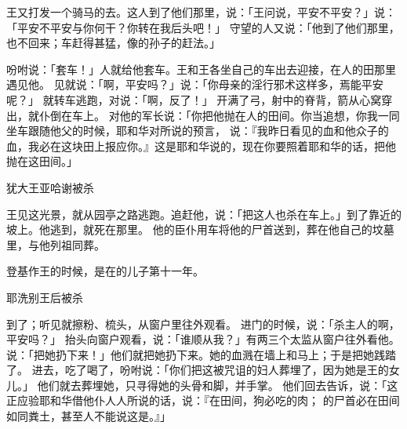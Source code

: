 {王又打发一个骑马的去。这人到了他们那里，说：「王问说，平安不平安？」{}说：「平安不平安与你何干？你转在我后头吧！」
守望的人又说：「他到了他们那里，也不回来；车赶得甚猛，像{}的孙子{}的赶法。」
\par }{\PP {}吩咐说：「套车！」人就给他套车。{}王{}和{}王{}各坐自己的车出去迎接{}，在{}人{}的田那里遇见他。
见{}就说：「{}啊，平安吗？」{}说：「你母亲{}的淫行邪术这样多，焉能平安呢？」
就转车逃跑，对{}说：「{}啊，反了！」
开满了弓，射中{}的脊背，箭从心窝穿出，{}就仆倒在车上。
对他的军长{}说：「你把他抛在{}人{}的田间。你当追想，你我一同坐车跟随他父{}的时候，耶和华对{}所说的预言，
说：『我昨日看见{}的血和他众子的血，我必在这块田上报应你。』这是耶和华说的，现在你要照着耶和华的话，把他抛在这田间。」
\par }{\SH 犹大王亚哈谢被杀
\par }{\PP {}王{}见这光景，就从园亭之路逃跑。{}追赶他，说：「把这人也杀在车上。」到了靠近{}{}的坡上{}。他逃到{}，就死在那里。
他的臣仆用车将他的尸首送到{}，葬在{}他自己的坟墓里，与他列祖同葬。
\par }{\PP {}登基作{}王的时候，是在{}的儿子{}第十一年。
\par }{\SH 耶洗别王后被杀
\par }{\PP {}到了{}；{}听见就擦粉、梳头，从窗户里往外观看。
进门的时候，{}说：「杀主人的{}啊，平安吗？」
抬头向窗户观看，说：「谁顺从我？」有两三个太监从窗户往外看他。
说：「把她扔下来！」他们就把她扔下来。她的血溅在墙上和马上；于是把她践踏了。
进去，吃了喝了，吩咐说：「你们把这被咒诅的妇人葬埋了，因为她是王的女儿。」
他们就去葬埋她，只寻得她的头骨和脚，并手掌。
他们回去告诉{}，{}说：「这正应验耶和华借他仆人{}人{}所说的话，说：『在{}田间，狗必吃{}的肉；
的尸首必在{}田间如同粪土，甚至人不能说这是{}。』」

}
